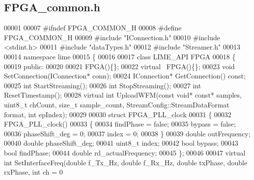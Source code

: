 \subsection{F\+P\+G\+A\+\_\+common.\+h}
\label{FPGA__common_8h_source}

\begin{DoxyCode}
00001 
00007 \textcolor{preprocessor}{#ifndef FPGA\_COMMON\_H}
00008 \textcolor{preprocessor}{#define FPGA\_COMMON\_H}
00009 \textcolor{preprocessor}{#include "IConnection.h"}
00010 \textcolor{preprocessor}{#include <stdint.h>}
00011 \textcolor{preprocessor}{#include "dataTypes.h"}
00012 \textcolor{preprocessor}{#include "Streamer.h"}
00013 
00014 \textcolor{keyword}{namespace }lime
00015 \{
00016      
00017 \textcolor{keyword}{class }LIME_API FPGA
00018 \{
00019 \textcolor{keyword}{public}:
00020     
00021     FPGA()\{\};
00022     \textcolor{keyword}{virtual} ~FPGA()\{\};
00023     \textcolor{keywordtype}{void} SetConnection(IConnection* conn);
00024     IConnection* GetConnection() \textcolor{keyword}{const};
00025     \textcolor{keywordtype}{int} StartStreaming();
00026     \textcolor{keywordtype}{int} StopStreaming();
00027     \textcolor{keywordtype}{int} ResetTimestamp();
00028     \textcolor{keyword}{virtual} \textcolor{keywordtype}{int} UploadWFM(\textcolor{keyword}{const} \textcolor{keywordtype}{void}* \textcolor{keyword}{const}* samples, uint8\_t chCount, \textcolor{keywordtype}{size\_t} 
      sample_count, StreamConfig::StreamDataFormat format, \textcolor{keywordtype}{int} epIndex);
00029     
00030     \textcolor{keyword}{struct }FPGA_PLL_clock
00031     \{
00032         FPGA_PLL_clock()
00033         \{
00034            findPhase = \textcolor{keyword}{false};
00035            bypass = \textcolor{keyword}{false};
00036            phaseShift\_deg = 0;
00037            index = 0;
00038         \}
00039         \textcolor{keywordtype}{double} outFrequency;
00040         \textcolor{keywordtype}{double} phaseShift_deg;
00041         uint8\_t index;
00042         \textcolor{keywordtype}{bool} bypass;
00043         \textcolor{keywordtype}{bool} findPhase;
00044         \textcolor{keywordtype}{double} rd_actualFrequency;
00045     \};
00046 
00047     \textcolor{keyword}{virtual} \textcolor{keywordtype}{int} SetInterfaceFreq(\textcolor{keywordtype}{double} f\_Tx\_Hz, \textcolor{keywordtype}{double} f\_Rx\_Hz, \textcolor{keywordtype}{double} txPhase, \textcolor{keywordtype}{double} rxPhase, \textcolor{keywordtype}{int} ch = 0

\end{DoxyCode}
